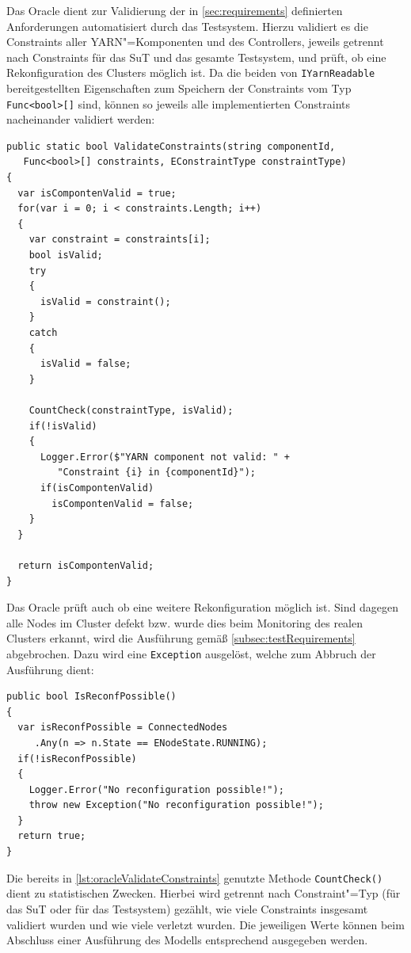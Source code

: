 Das Oracle dient zur Validierung der  in \cref{sec:requirements} definierten Anforderungen automatisiert durch das Testsystem.
Hierzu validiert es die Constraints aller \ac{YARN}"=Komponenten und des Controllers, jeweils getrennt nach Constraints für das \ac{SuT} und das gesamte Testsystem, und prüft, ob eine Rekonfiguration des Clusters möglich ist.
Da die beiden von \texttt{IYarnReadable} bereitgestellten Eigenschaften zum Speichern der Constraints vom Typ \texttt{Func<bool>[]} sind, können so jeweils alle implementierten Constraints nacheinander validiert werden:

\begin{lstlisting}[label=lst:oracleValidateConstraints,style=cs,
caption={[Validieren der Constraints durch das Oracle]
    Validieren der Constraints durch das Oracle.
    Die zu validierenden Constraints werden im Parameter \texttt{constraints} übergeben, der Parameter \texttt{constraintType} dient zu statistischen Zwecken in \texttt{CountCheck()}.}]
public static bool ValidateConstraints(string componentId,
   Func<bool>[] constraints, EConstraintType constraintType)
{
  var isCompontenValid = true;
  for(var i = 0; i < constraints.Length; i++)
  {
    var constraint = constraints[i];
    bool isValid;
    try
    {
      isValid = constraint();
    }
    catch
    {
      isValid = false;
    }
    
    CountCheck(constraintType, isValid);
    if(!isValid)
    {
      Logger.Error($"YARN component not valid: " +
         "Constraint {i} in {componentId}");
      if(isCompontenValid)
        isCompontenValid = false;
    }
  }
  
  return isCompontenValid;
}
\end{lstlisting}

Das Oracle prüft auch ob eine weitere Rekonfiguration möglich ist.
Sind dagegen alle Nodes im Cluster defekt bzw. wurde dies beim Monitoring des realen Clusters erkannt, wird die Ausführung gemäß \cref{subsec:testRequirements} abgebrochen.
Dazu wird eine \texttt{Exception} ausgelöst, welche zum Abbruch der Ausführung dient:

\begin{lstlisting}[label=lst:oracleIsReconfPossible,style=cs,
caption={Prüfung nach der Möglichkeit weiterer Rekonfigurationen}]
public bool IsReconfPossible()
{
  var isReconfPossible = ConnectedNodes
     .Any(n => n.State == ENodeState.RUNNING);
  if(!isReconfPossible)
  {
    Logger.Error("No reconfiguration possible!");
    throw new Exception("No reconfiguration possible!");
  }
  return true;
}
\end{lstlisting}

Die bereits in \cref{lst:oracleValidateConstraints} genutzte Methode \texttt{CountCheck()} dient zu statistischen Zwecken.
Hierbei wird getrennt nach Constraint"=Typ (für das \ac{SuT} oder für das Testsystem) gezählt, wie viele Constraints insgesamt validiert wurden und wie viele verletzt wurden.
Die jeweiligen Werte können beim Abschluss einer Ausführung des Modells entsprechend ausgegeben werden.
